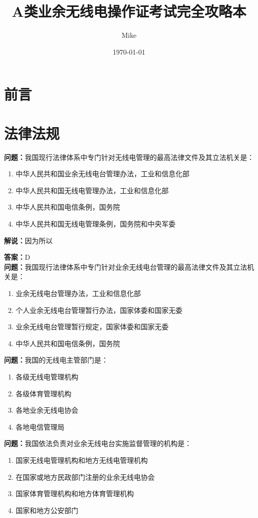 \documentclass{ctexbook}
\title{A类业余无线电操作证考试完全攻略本}
\author{Mike}
\date{\today}
\begin{document}
\maketitle
\tableofcontents
\chapter*{前言}
\chapter{法律法规}

\textbf{问题：}我国现行法律体系中专门针对无线电管理的最高法律文件及其立法机关是：
\begin{enumerate}[label=\Alph*), leftmargin=3em]
\item 中华人民共和国业余无线电台管理办法，工业和信息化部
\item 中华人民共和国无线电管理办法，工业和信息化部
\item 中华人民共和国电信条例，国务院
\item 中华人民共和国无线电管理条例，国务院和中央军委
\end{enumerate}
\textbf{解说：}因为所以\par
\textbf{答案：}D
\\

\textbf{问题：}我国现行法律体系中专门针对业余无线电台管理的最高法律文件及其立法机关是：
\begin{enumerate}[label=\Alph*), leftmargin=3em]
\item 业余无线电台管理办法，工业和信息化部
\item 个人业余无线电台管理暂行办法，国家体委和国家无委
\item 业余无线电台管理暂行规定，国家体委和国家无委
\item 中华人民共和国电信条例，国务院
\end{enumerate}

\textbf{问题：}我国的无线电主管部门是：
\begin{enumerate}[label=\Alph*), leftmargin=3em]
\item 各级无线电管理机构
\item 各级体育管理机构
\item 各地业余无线电协会
\item 各地电信管理局
\end{enumerate}

\textbf{问题：}我国依法负责对业余无线电台实施监督管理的机构是：
\begin{enumerate}[label=\Alph*), leftmargin=3em]
\item 国家无线电管理机构和地方无线电管理机构
\item 在国家或地方民政部门注册的业余无线电协会
\item 国家体育管理机构和地方体育管理机构
\item 国家和地方公安部门
\end{enumerate}
\end{document}
